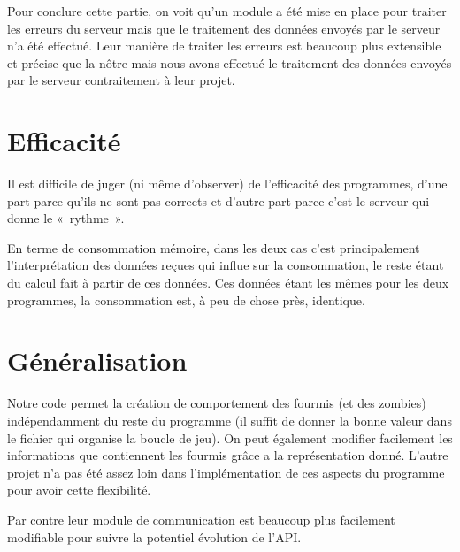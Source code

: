 \documentclass[12pt,a4paper]{report}
\begin{document}
Pour conclure cette partie, on voit qu'un module a été mise en place
pour traiter les erreurs du serveur mais que le traitement des données
envoyés par le serveur n'a été effectué. Leur manière de traiter les erreurs
est beaucoup plus extensible et précise que la nôtre mais nous avons effectué
le traitement des données envoyés par le serveur contraitement à leur projet.

\section{Efficacité}

Il est difficile de juger (ni même d'observer) de l'efficacité des programmes,
d'une part parce qu'ils ne sont pas corrects et d'autre part parce c'est le
serveur qui donne le « rythme ».

En terme de consommation mémoire, dans les deux cas c'est principalement
l'interprétation des données reçues qui influe sur la consommation, le reste
étant du calcul fait à partir de ces données. Ces données étant les mêmes pour
les deux programmes, la consommation est, à peu de chose près, identique. 

\section{Généralisation}

Notre code permet la création de comportement des fourmis (et des zombies)
indépendamment du reste du programme (il suffit de donner la bonne valeur
dans le fichier qui organise la boucle de jeu). On peut également modifier
facilement les informations que contiennent les fourmis grâce a la
représentation donné. L'autre projet n'a pas été assez loin dans
l'implémentation de ces aspects du programme pour avoir cette flexibilité.\newline

Par contre leur module de communication est beaucoup plus facilement
modifiable pour suivre la potentiel évolution de l'API.
\end{document}
